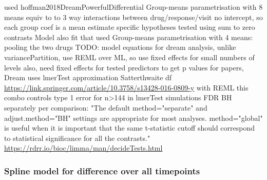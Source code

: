 \begin{outline}
\1 used  hoffman2018DreamPowerfulDifferential
\1 Group-means parametrisation with 8 means
    \2 equiv to to 3 way interactions between drug/response/visit
    \2 no intercept, so each group coef is a mean estimate
\1 specific hypotheses tested using sum to zero contrasts 
\1 Model also fit that used Group-means parametrisation with 4 means: pooling the two drugs
\1 TODO: model equations
    \2 for dream analysis, unlike variancePartition, use REML over ML, so use fixed effects for small numbers of levels
    \2 also, need fixed effects for tested predictors
    \2 to get p values for papers, Dream uses lmerTest approximation Satterthwaite df \url{https://link.springer.com/article/10.3758/s13428-016-0809-y} with REML
    \2 this combo controls type 1 error for n>144 in lmerTest simulations
    \2 FDR BH separately per comparison: "The default method="separate" and adjust.method="BH" settings are appropriate for most analyses. method="global" is useful when it is important that the same t-statistic cutoff should correspond to statistical significance for all the contrasts." \url{https://rdrr.io/bioc/limma/man/decideTests.html}


\subsubsection{Spline model for difference over all timepoints}



\end{outline}
